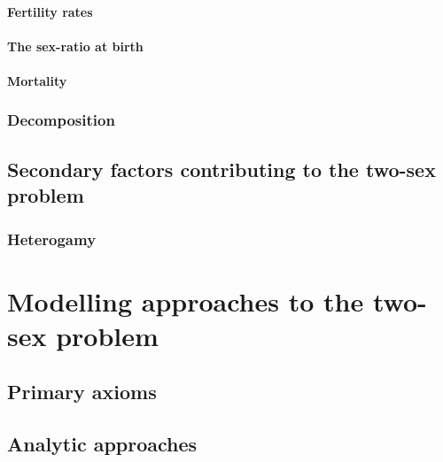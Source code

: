       \subsubsection{Fertility rates}
        
      
      \subsubsection{The sex-ratio at birth}
        
      
      \subsubsection{Mortality}
        
    
    \subsection{Decomposition}
      
  
  \section{Secondary factors contributing to the two-sex problem}
      
    
    \subsection{Heterogamy}
      
      

\chapter{Modelling approaches to the two-sex problem}
  

  \section{Primary axioms}
    
    
  \section{Analytic approaches}
  
